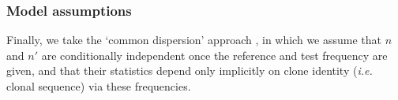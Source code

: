 \documentclass[letterpaper,english,prl,reprint,longbibliography]{revtex4-1} %
\begin{document}



\subsubsection*{Model assumptions}
Finally, we take the `common dispersion' approach \citep{Robinson2008}, in which we assume that $n$ and $n'$ are conditionally independent once the reference and test frequency are given, and that their statistics depend only implicitly on clone identity (\emph{i.e.} clonal sequence) via these frequencies.
\end{document}
